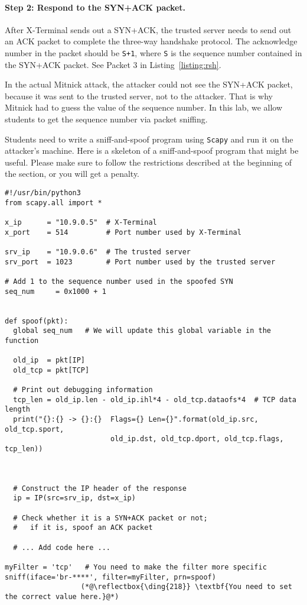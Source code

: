 \paragraph{Step 2: Respond to the SYN+ACK packet.}
After X-Terminal sends out a SYN+ACK, the trusted server needs 
to send out an ACK packet to complete the three-way handshake protocol. 
The acknowledge number in the packet should be \texttt{S+1}, where 
\texttt{S} is the sequence number contained in the SYN+ACK packet. 
See Packet 3 in Listing~\ref{listing:rsh}.

In the actual Mitnick attack, the attacker could not see the SYN+ACK packet, because
it was sent to the trusted server, not to the attacker. 
That is why Mitnick had to guess the value of the sequence number.
In this lab, we allow students to get 
the sequence number via packet sniffing. 

Students need to write a sniff-and-spoof program using \texttt{Scapy} and run it
on the attacker's machine. Here is a skeleton of a sniff-and-spoof program that might be
useful. Please make sure to follow the restrictions described at the
beginning of the section, or you will get a penalty. 


\begin{lstlisting}
#!/usr/bin/python3
from scapy.all import *

x_ip      = "10.9.0.5"  # X-Terminal
x_port    = 514         # Port number used by X-Terminal

srv_ip    = "10.9.0.6"  # The trusted server
srv_port  = 1023        # Port number used by the trusted server

# Add 1 to the sequence number used in the spoofed SYN
seq_num     = 0x1000 + 1


def spoof(pkt):
  global seq_num   # We will update this global variable in the function

  old_ip  = pkt[IP]
  old_tcp = pkt[TCP]

  # Print out debugging information
  tcp_len = old_ip.len - old_ip.ihl*4 - old_tcp.dataofs*4  # TCP data length
  print("{}:{} -> {}:{}  Flags={} Len={}".format(old_ip.src, old_tcp.sport,
                         old_ip.dst, old_tcp.dport, old_tcp.flags, tcp_len))



  # Construct the IP header of the response
  ip = IP(src=srv_ip, dst=x_ip)

  # Check whether it is a SYN+ACK packet or not;
  #   if it is, spoof an ACK packet

  # ... Add code here ...

myFilter = 'tcp'   # You need to make the filter more specific
sniff(iface='br-****', filter=myFilter, prn=spoof)
                  (*@\reflectbox{\ding{218}} \textbf{You need to set the correct value here.}@*)   
\end{lstlisting}




